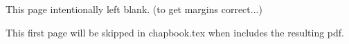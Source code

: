 \documentclass[10pt,twoside,openany,article]{memoir}
\begin{document}
This page intentionally left blank. (to get margins correct...)

This first page will be skipped in chapbook.tex when includes the resulting pdf.
\clearpage

\end{document}
